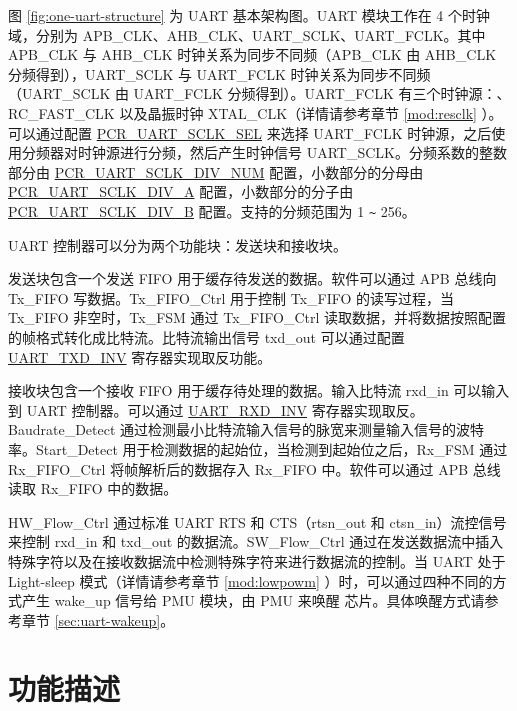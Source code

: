 \documentclass[main\_\_CN.tex]{subfiles}
\begin{document}
图 \ref{fig:one-uart-structure} 为 UART 基本架构图。UART 模块工作在 4 个时钟域，分别为 APB\_CLK、AHB\_CLK、UART\_SCLK、UART\_FCLK。其中 APB\_CLK 与 AHB\_CLK 时钟关系为同步不同频（APB\_CLK 由 AHB\_CLK 分频得到），UART\_SCLK 与 UART\_FCLK 时钟关系为同步不同频（UART\_SCLK 由 UART\_FCLK 分频得到）。UART\_FCLK 有三个时钟源：、RC\_FAST\_CLK 以及晶振时钟 XTAL\_CLK（详情请参考章节 \ref{mod:resclk} \textit{}）。可以通过配置 \hyperref[fielddesc:PCRUART0SCLKSEL]{PCR\_UART\_SCLK\_SEL} 来选择 UART\_FCLK 时钟源，之后使用分频器对时钟源进行分频，然后产生时钟信号 UART\_SCLK。分频系数的整数部分由 \hyperref[fielddesc:PCRUART0SCLKDIVNUM]{PCR\_UART\_SCLK\_DIV\_NUM} 配置，小数部分的分母由 \hyperref[fielddesc:PCRUART0SCLKDIVA]{PCR\_UART\_SCLK\_DIV\_A} 配置，小数部分的分子由 \hyperref[fielddesc:PCRUART0SCLKDIVB]{PCR\_UART\_SCLK\_DIV\_B} 配置。支持的分频范围为 1 \verb+~+ 256。


UART 控制器可以分为两个功能块：发送块和接收块。

发送块包含一个发送 FIFO 用于缓存待发送的数据。软件可以通过 APB 总线向 Tx\_FIFO 写数据。Tx\_FIFO\_Ctrl 用于控制 Tx\_FIFO 的读写过程，当 Tx\_FIFO 非空时，Tx\_FSM 通过 Tx\_FIFO\_Ctrl 读取数据，并将数据按照配置的帧格式转化成比特流。比特流输出信号 txd\_out 可以通过配置 \hyperref[fielddesc:UARTTXDINV]{UART\_TXD\_INV} 寄存器实现取反功能。

接收块包含一个接收 FIFO 用于缓存待处理的数据。输入比特流 rxd\_in 可以输入到 UART 控制器。可以通过 \hyperref[fielddesc:UARTRXDINV]{UART\_RXD\_INV} 寄存器实现取反。Baudrate\_Detect 通过检测最小比特流输入信号的脉宽来测量输入信号的波特率。Start\_Detect 用于检测数据的起始位，当检测到起始位之后，Rx\_FSM 通过 Rx\_FIFO\_Ctrl 将帧解析后的数据存入 Rx\_FIFO 中。软件可以通过 APB 总线读取 Rx\_FIFO 中的数据。

HW\_Flow\_Ctrl 通过标准 UART RTS 和 CTS（rtsn\_out 和 ctsn\_in）流控信号来控制 rxd\_in 和 txd\_out 的数据流。SW\_Flow\_Ctrl 通过在发送数据流中插入特殊字符以及在接收数据流中检测特殊字符来进行数据流的控制。当 UART 处于 Light-sleep 模式（详情请参考章节 \ref{mod:lowpowm} \textit{}）时，可以通过四种不同的方式产生 wake\_up 信号给 PMU 模块，由 PMU 来唤醒 \chipname{} 芯片。具体唤醒方式请参考章节 \ref{sec:uart-wakeup}。


\section{功能描述}
\end{document}
